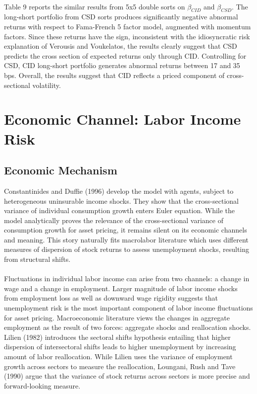 \documentclass[12pt]{article}
\begin{document}
\paragraph{}
Table 9 reports the similar results from 5x5 double sorts on $\beta_{CID}$ and $\beta_{CSD}$. The long-short portfolio from CSD sorts produces significantly negative abnormal returns with respect to Fama-French 5 factor model, augmented with momentum factors. Since these returns have the sign, inconsistent with the idiosyncratic risk explanation of Verousis and Voukelatos, the results clearly suggest that CSD predicts the cross section of expected returns only through CID. Controlling for CSD, CID long-short portfolio generates abnormal returns between 17 and 35 bps. Overall, the results suggest that CID reflects a priced component of cross-sectional volatility.

\section{Economic Channel: Labor Income Risk} \label{sec:Model}

\subsection{Economic Mechanism}

Constantinides and Duffie (1996) develop the model with agents, subject to heterogeneous uninsurable income shocks. They show that the cross-sectional variance of individual consumption growth enters Euler equation. While the model analytically proves the relevance of the cross-sectional variance of consumption growth for asset pricing, it remains silent on its economic channels and meaning. This story naturally fits macrolabor literature which uses different measures of dispersion of stock returns to assess unemployment shocks, resulting from structural shifts.
\paragraph{}
Fluctuations in individual labor income can arise from two channels: a change in wage and a change in employment. Larger magnitude of labor income shocks from employment loss as well as downward wage rigidity suggests that unemployment risk is the most important component of labor income fluctuations for asset pricing. Macroeconomic literature views the changes in aggregate employment as the result of two forces: aggregate shocks and reallocation shocks. Lilien (1982) introduces the sectoral shifts hypothesis entailing that higher dispersion of intersectoral shifts leads to higher unemployment by increasing amount of labor reallocation. While Lilien uses the variance of employment growth across sectors to measure the reallocation, Loungani, Rush and Tave (1990) argue that the variance of stock returns across sectors is more precise and forward-looking measure. 
\end{document}
